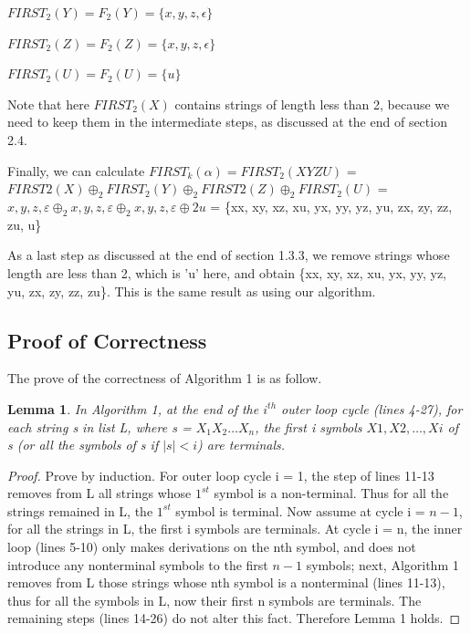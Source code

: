 \documentclass{sig-alternate-05-2015}
\newtheorem{lemma}{Lemma}
\begin{document}
$FIRST_2(Y) = F_2(Y) = \{x, y, z, \epsilon\}$

$FIRST_2(Z) = F_2(Z) = \{x, y, z, \epsilon\}$

$FIRST_2(U) = F_2(U) = \{u\}$

\hfill

Note that here $FIRST_2(X)$ contains strings of length less
than 2, because we need to keep them in the intermediate
steps, as discussed at the end of section 2.4.

Finally, we can calculate $FIRST_k(\alpha) = FIRST_2(XYZU)$
= $FIRST2(X)\oplus_2FIRST_2(Y)\oplus_2 FIRST2(Z)\oplus_2 FIRST_2(U)$
= ${x, y, z, ε}\oplus_2{x, y, z, ε}\oplus_2{x, y, z, ε}\oplus2{u}$
= \{xx, xy, xz, xu, yx, yy, yz, yu, zx, zy, zz, zu, u\}

As a last step as discussed at the end of section 1.3.3, we
remove strings whose length are less than 2, which is 'u'
here, and obtain \{xx, xy, xz, xu, yx, yy, yz, yu, zx, zy, zz,
zu\}. This is the same result as using our algorithm.


\subsection{Proof of Correctness}
The prove of the correctness of Algorithm 1 is as follow.

\begin{lemma}
In Algorithm 1, at the end of the $i^{th}$ outer
loop cycle (lines 4-27), for each string s in list L, where s =
$X_1X_2…X_n$, the first i symbols $X1, X2, …, Xi$ of s (or all the
symbols of s if $\mid s \mid < i$) are terminals.
\end{lemma}
\begin{proof}
Prove by induction. For outer loop cycle i = 1, the
step of lines 11-13 removes from L all strings whose $1^{st}$
symbol is a non-terminal. Thus for all the strings remained
in L, the $1^{st}$ symbol is terminal. Now assume at cycle i =
 $n-1$, for all the strings in L, the first i symbols are terminals.
At cycle i = n, the inner loop (lines 5-10) only makes derivations
on the nth symbol, and does not introduce any nonterminal
symbols to the first $n-1$ symbols; next, Algorithm
1 removes from L those strings whose nth symbol is a nonterminal
(lines 11-13), thus for all the symbols in L, now
their first n symbols are terminals. The remaining steps
(lines 14-26) do not alter this fact. Therefore Lemma 1
holds.
\end{proof}
\end{document}
